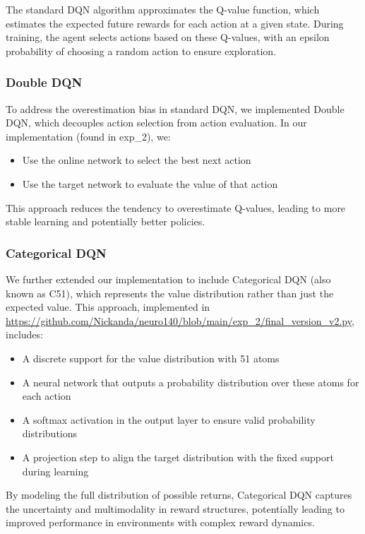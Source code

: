 \documentclass{article} %
\begin{document}
The standard DQN algorithm approximates the Q-value function, which estimates the expected future rewards for each action at a given state. During training, the agent selects actions based on these Q-values, with an epsilon probability of choosing a random action to ensure exploration.

\subsubsection{Double DQN}

To address the overestimation bias in standard DQN, we implemented Double DQN, which decouples action selection from action evaluation. In our implementation (found in exp\_2), we:
\begin{itemize}
  \item Use the online network to select the best next action
  \item Use the target network to evaluate the value of that action
\end{itemize}

This approach reduces the tendency to overestimate Q-values, leading to more stable learning and potentially better policies.

\subsubsection{Categorical DQN}

We further extended our implementation to include Categorical DQN (also known as C51), which represents the value distribution rather than just the expected value. This approach, implemented in \url{https://github.com/Nickanda/neuro140/blob/main/exp_2/final_version_v2.py}, includes:
\begin{itemize}
  \item A discrete support for the value distribution with 51 atoms
  \item A neural network that outputs a probability distribution over these atoms for each action
  \item A softmax activation in the output layer to ensure valid probability distributions
  \item A projection step to align the target distribution with the fixed support during learning
\end{itemize}

By modeling the full distribution of possible returns, Categorical DQN captures the uncertainty and multimodality in reward structures, potentially leading to improved performance in environments with complex reward dynamics.
\end{document}
